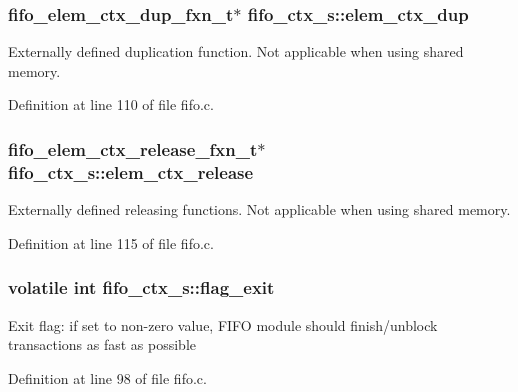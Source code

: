 \subsubsection[{\texorpdfstring{elem\+\_\+ctx\+\_\+dup}{elem_ctx_dup}}]{\setlength{\rightskip}{0pt plus 5cm}fifo\+\_\+elem\+\_\+ctx\+\_\+dup\+\_\+fxn\+\_\+t$\ast$ fifo\+\_\+ctx\+\_\+s\+::elem\+\_\+ctx\+\_\+dup}\hypertarget{structfifo__ctx__s_a29fe5cab2bded769f7aff0050877aa65}{}\label{structfifo__ctx__s_a29fe5cab2bded769f7aff0050877aa65}
Externally defined duplication function. Not applicable when using shared memory. 

Definition at line 110 of file fifo.\+c.

\subsubsection[{\texorpdfstring{elem\+\_\+ctx\+\_\+release}{elem_ctx_release}}]{\setlength{\rightskip}{0pt plus 5cm}fifo\+\_\+elem\+\_\+ctx\+\_\+release\+\_\+fxn\+\_\+t$\ast$ fifo\+\_\+ctx\+\_\+s\+::elem\+\_\+ctx\+\_\+release}\hypertarget{structfifo__ctx__s_a5d110b8cfb21fe7f732ba5efc0013d59}{}\label{structfifo__ctx__s_a5d110b8cfb21fe7f732ba5efc0013d59}
Externally defined releasing functions. Not applicable when using shared memory. 

Definition at line 115 of file fifo.\+c.

\subsubsection[{\texorpdfstring{flag\+\_\+exit}{flag_exit}}]{\setlength{\rightskip}{0pt plus 5cm}volatile int fifo\+\_\+ctx\+\_\+s\+::flag\+\_\+exit}\hypertarget{structfifo__ctx__s_a4856c98e4576bd328ff3ee4063b1421a}{}\label{structfifo__ctx__s_a4856c98e4576bd328ff3ee4063b1421a}
Exit flag\+: if set to non-\/zero value, F\+I\+FO module should finish/unblock transactions as fast as possible 

Definition at line 98 of file fifo.\+c.

